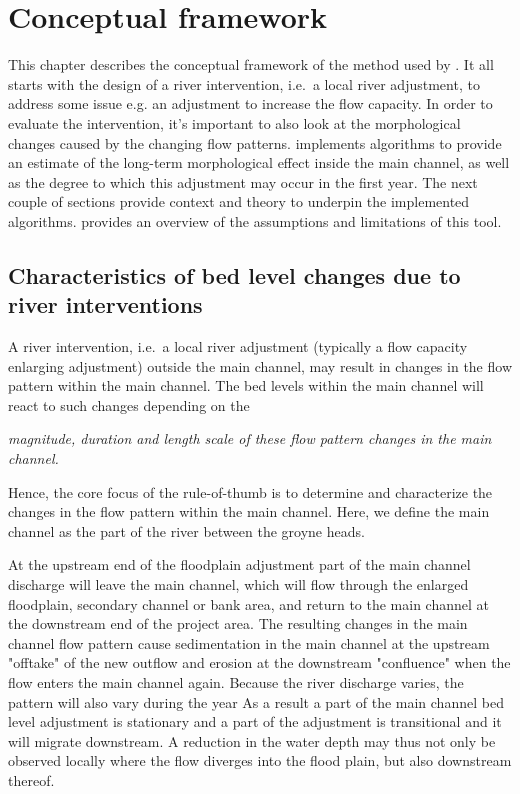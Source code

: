 \chapter{Conceptual framework} \label{Chp:Concepts}

This chapter describes the conceptual framework of the method used by \dfastmi.
It all starts with the design of a river intervention, i.e.~a local river adjustment, to address some issue e.g. an adjustment to increase the flow capacity.
In order to evaluate the intervention, it's important to also look at the morphological changes caused by the changing flow patterns.
\dfastmi implements algorithms to provide an estimate of the long-term morphological effect inside the main channel, as well as the degree to which this adjustment may occur in the first year.
The next couple of sections provide context and theory to underpin the implemented algorithms.
 provides an overview of the assumptions and limitations of this tool.


\section{Characteristics of bed level changes due to river interventions}

A river intervention, i.e.~a local river adjustment (typically a flow capacity enlarging adjustment) outside the main channel, may result in changes in the flow pattern within the main channel.
The bed levels within the main channel will react to such changes depending on the

\hspace{1cm}\emph{magnitude, duration and length scale of these flow pattern changes in the main channel.}

Hence, the core focus of the rule-of-thumb is to determine and characterize the changes in the flow pattern within the main channel.
Here, we define the main channel as the part of the river between the groyne heads.

At the upstream end of the floodplain adjustment part of the main channel discharge will leave the main channel, which will flow through the enlarged floodplain, secondary channel or bank area, and return to the main channel at the downstream end of the project area.
The resulting changes in the main channel flow pattern cause sedimentation in the main channel at the upstream "offtake" of the new outflow and erosion at the downstream "confluence" when the flow enters the main channel again.
Because the river discharge varies, the pattern will also vary during the year
As a result a part of the main channel bed level adjustment is stationary and a part of the adjustment is transitional and it will migrate downstream.
A reduction in the water depth may thus not only be observed locally where the flow diverges into the flood plain, but also downstream thereof.

